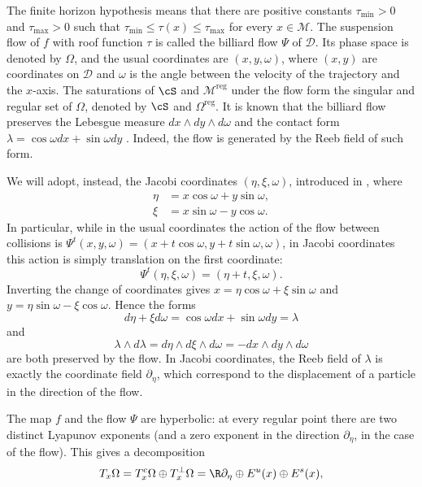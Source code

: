 \documentclass[reqno,11pt]{amsart}
\begin{document}
The finite horizon hypothesis means that there are positive constants \( \tau_\mathrm{min}>0 \) and \( \tau_\mathrm{max}>0 \) such that
\( \tau_\mathrm{min} \leq \tau(x) \leq \tau_\mathrm{max} \) for every \( x \in \mathcal{M} \).
The suspension flow of \( f \) with roof function \( \tau \) is called the billiard flow \( \Psi \) of \( \mathcal{D} \). 
Its phase space is denoted by \( \Omega \), and the usual coordinates are \((x, y, \omega)\), where \((x,y)\) are coordinates on \(\mathcal{D}\) and \(\omega\) is the angle between the velocity of the trajectory and the \(x\)-axis.
The saturations of \(\cS\) and \(\mathcal{M}^{\mathrm{reg}}\) under the flow form the singular and regular set of \(\Omega\), denoted by \(\cS\) and \(\Omega^{\mathrm{reg}}\).
It is known that the billiard flow preserves the Lebesgue measure \(dx\wedge dy\wedge d\omega\) and the contact form \(\lambda = \cos\omega dx + \sin\omega dy\) \cite{chernov_chaotic_2006}.
Indeed, the flow is generated by the Reeb field of such form.
\par We will adopt, instead, the Jacobi coordinates \((\eta, \xi, \omega)\), introduced in \cite{wojtkowski_two_1994}, where
\begin{align*}
    \eta &= x\cos\omega + y\sin\omega, \\
    \xi &= x\sin\omega - y\cos\omega.
\end{align*}
In particular, while in the usual coordinates the action of the flow between collisions is \(\Psi^t(x, y, \omega) = (x + t\cos\omega, y+t\sin\omega, \omega)\), in Jacobi coordinates this action is simply translation on the first coordinate: 
\[
    \Psi^t(\eta, \xi, \omega) = (\eta + t, \xi, \omega).
\]
Inverting the change of coordinates gives \(x = \eta\cos\omega  + \xi\sin\omega \) and \( y = \eta\sin\omega  - \xi\cos\omega \).
Hence the forms
\[
    d\eta + \xi d\omega = \cos\omega dx + \sin\omega dy = \lambda
\]
and
\[
   \lambda \wedge d\lambda =  d\eta\wedge d\xi\wedge d\omega = - dx\wedge dy\wedge d\omega
\]
are both preserved by the flow.
In Jacobi coordinates, the Reeb field of \(\lambda\) is exactly the coordinate field \(\partial_\eta\), which correspond to the displacement of a particle in the direction of the flow.
\par The map \(f\) and the flow \(\Psi\) are hyperbolic: at every regular point there are two distinct Lyapunov exponents (and a zero exponent in the direction \(\partial_\eta\), in the case of the flow). 
This gives a decomposition 
\[
    T_x\Omega = T^c_x\Omega \oplus T^\perp_x\Omega = \R\partial_\eta \oplus E^u(x) \oplus E^s(x),
\]
\end{document}
